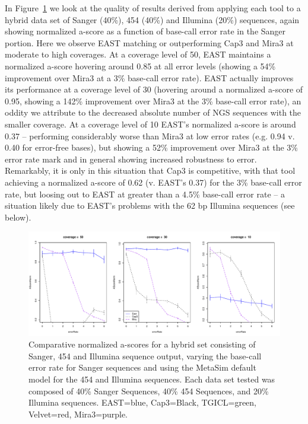 \documentclass[10pt]{bmc_article}
\newcommand{\capthree} {{\small Cap3}}
\newcommand{\tgicl} {{\small TGICL}}
\newcommand{\east} {{\small EAST}}
\newcommand{\velvet}{{\small Velvet}}
\newcommand{\mira}{{\small Mira3}}
\newenvironment{bmcformat}{\begin{raggedright}\baselineskip20pt\sloppy\setboolean{publ}{false}}{\end{raggedright}\baselineskip20pt\sloppy}
\begin{document}
\begin{bmcformat}
 In Figure~\ref{hybridAscore} we look at the
quality of results derived from applying each tool to a hybrid data
set of Sanger (40\%), 454 (40\%) and Illumina (20\%) sequences, again
showing normalized a-score as a function of base-call error rate in
the Sanger portion.  Here we observe \east\/ matching or outperforming
\capthree\/ and \mira\/ at moderate to high coverages.  At a coverage
level of 50, \east\/ maintains a normalized a-score hovering around
0.85 at all error levels (showing a 54\% improvement over \mira\/ at a
3\% base-call error rate).  \east\/ actually improves its performance
at a coverage level of 30 (hovering around a normalized a-score of
0.95, showing a 142\% improvement over \mira\/ at the 3\% base-call error
rate), an oddity we attribute to the decreased absolute number of NGS
sequences with the smaller coverage.  At a coverage level of 10
\east's normalized a-score is around 0.37 -- performing considerably
worse than \mira\/ at low error rates (e.g. 0.94 v. 0.40 for
error-free bases), but showing a 52\% improvement over \mira\/ at the
3\% error rate mark and in general showing increased robustness to
error.  Remarkably, it is only in this situation that \capthree\/ is
competitive, with that tool achieving a normalized a-score of 0.62
(v. \east's 0.37) for the 3\% base-call error rate, but loosing out to
\east\/ at greater than a 4.5\% base-call error rate -- a situation
likely due to \east's problems with the 62 bp Illumina sequences (see
below).

\begin{figure}[htb]
\centerline{\includegraphics[width=6in]{pics.d/ascore_hybrid.pdf}}
\caption{Comparative normalized a-scores for a hybrid set consisting
  of Sanger, 454 and Illumina sequence output, varying the base-call
  error rate for Sanger sequences and using the MetaSim default model
  for the 454 and Illumina sequences.  Each data set tested was
  composed of 40\% Sanger Sequences, 40\% 454 Sequences, and 20\%
  Illumina sequences.  \east=blue, \capthree=Black, \tgicl=green,
  \velvet=red, \mira=purple.}
\label{hybridAscore}
\end{figure}


\end{bmcformat}
\end{document}
